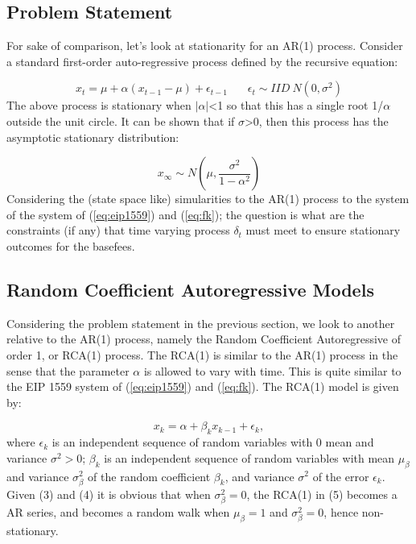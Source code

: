 \documentclass{article}
\begin{document}
\subsection{Problem Statement}
\label{section:problem_statement}
For sake of comparison, let's look at stationarity for an AR(1) process. Consider a standard first-order auto-regressive process defined by the recursive equation:

\begin{equation}
x_{t} = \mu + \alpha (x_{t-1} -\mu) + \epsilon_{t-1} ~~~~~~~~ \epsilon_{t} \sim IID~N(0,\sigma^2)
\label{eq:ar1} 
\end{equation}
The above process is stationary when $|\alpha|$<1 so that this has a single root 1/$\alpha$ outside the unit circle.  It can be shown that if $\sigma$>0, then this process has the asymptotic stationary distribution:

\begin{equation}
x_{\infty} \sim N(\mu,\frac{\sigma^2}{1-\alpha^2})
\label{eq:x_infinity} 
\end{equation}
Considering the (state space like) simularities to the AR(1) process to the system of the system of (\ref{eq:eip1559}) and (\ref{eq:fk}); the question is what are the constraints (if any) that time varying process $\delta_{t}$ must meet to ensure stationary outcomes for the basefees.

\subsection{Random Coefficient Autoregressive Models}
\label{section:rca}

Considering the problem statement in the previous section, we look to another relative to the AR(1) process, namely the Random Coefficient Autoregressive of order 1, or RCA(1) process. The RCA(1) is similar to the AR(1) process in the sense that the parameter $\alpha$ is allowed to vary with time. This is quite similar to the EIP 1559 system of (\ref{eq:eip1559}) and (\ref{eq:fk}). The RCA(1) model is given by:

\begin{equation}
x_{k} = \alpha + \beta_{k}x_{k-1} + \epsilon_{k},
\label{eq:rca1}
\end{equation}
where ${\epsilon_{k}}$ is an independent sequence of random variables with 0 mean and variance $\sigma^2 > 0$; ${\beta_{k}}$ is an independent sequence of random variables with mean $\mu_{\beta}$ and variance $\sigma_{\beta}^2$ of the random coefficient $\beta_{k}$, and variance $\sigma^2$ of the error $\epsilon_{k}$. Given (3) and (4) it is obvious that when $\sigma_{\beta}^2 = 0$, the RCA(1) in (5) becomes a AR series, and becomes a random walk when $\mu_{\beta} = 1$ and $\sigma_{\beta}^2 = 0$, hence non-stationary. 
\end{document}
